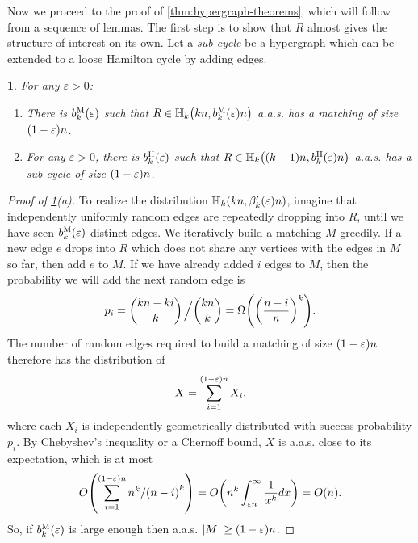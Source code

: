 \documentclass[11pt,english]{article}
\theoremstyle{plain}
\theoremstyle{definition}
\theoremstyle{definition}
\theoremstyle{plain}
\theoremstyle{plain}
\theoremstyle{plain}
\newtheorem{lem}[thm]{\protect\lemmaname}
\theoremstyle{plain}
\theoremstyle{remark}
\theoremstyle{remark}
\let\originalleft\left
\let\originalright\right
\renewcommand{\left}{\mathopen{}\mathclose\bgroup\originalleft}
\renewcommand{\right}{\aftergroup\egroup\originalright}
\providecommand{\lemmaname}{Lemma}
\begin{document}
Now we proceed to the proof of \ref{thm:hypergraph-theorems}, which
will follow from a sequence of lemmas. The first step is to show that
$R$ almost gives the structure of interest on its own. Let a\emph{
sub-cycle} be a hypergraph which can be extended to a loose Hamilton
cycle by adding edges.
\begin{lem}
\label{lem:hypergraph-almost-object}For any $\varepsilon>0$:

\begin{enumerate}[topsep=0px,label=(\alph*)]

\item{There is $b_{k}^{\mathrm{M}}\left(\varepsilon\right)$ such
that $R\in\HH_{k}\left(kn,b_{k}^{\mathrm{M}}\left(\varepsilon\right)n\right)$
a.a.s. has a matching of size $\left(1-\varepsilon\right)n$.}

\item{For any $\varepsilon>0$, there is $b_{k}^{\mathrm{H}}\left(\varepsilon\right)$
such that $R\in\HH_{k}\left(\left(k-1\right)n,b_{k}^{\mathrm{H}}\left(\varepsilon\right)n\right)$
a.a.s. has a sub-cycle of size $\left(1-\varepsilon\right)n$.}

\end{enumerate}\end{lem}
\begin{proof}
[Proof of \ref{lem:hypergraph-almost-object}(a)]To realize the distribution
$\HH_{k}\left(kn,\beta_{k}'\left(\varepsilon\right)n\right)$, imagine
that independently uniformly random edges are repeatedly dropping
into $R$, until we have seen $b_{k}^{\mathrm{M}}\left(\varepsilon\right)$
distinct edges. We iteratively build a matching $M$ greedily. If
a new edge $e$ drops into $R$ which does not share any vertices
with the edges in $M$ so far, then add $e$ to $M$. If we have already
added $i$ edges to $M$, then the probability we will add the next
random edge is
\[
p_{i}={kn-ki \choose k}\left.\vphantom{\sum}\right/{kn \choose k}=\Omega\left(\left(\frac{n-i}{n}\right)^{k}\right).
\]
The number of random edges required to build a matching of size $\left(1-\varepsilon\right)n$
therefore has the distribution of
\[
X=\sum_{i=1}^{\left(1-\varepsilon\right)n}X_{i},
\]
where each $X_{i}$ is independently geometrically distributed with
success probability $p_{i}$. By Chebyshev's inequality or a Chernoff
bound, $X$ is a.a.s. close to its expectation, which is at most
\[
O\left(\sum_{i=1}^{\left(1-\varepsilon\right)n}n^{k}/\left(n-i\right)^{k}\right)=O\left(n^{k}\int_{\varepsilon n}^{\infty}\frac{1}{x^{k}}dx\right)=O\left(n\right).
\]
So, if $b_{k}^{\mathrm{M}}\left(\varepsilon\right)$ is large enough
then a.a.s. $\left|M\right|\ge\left(1-\varepsilon\right)n$.
\end{proof}
\end{document}

